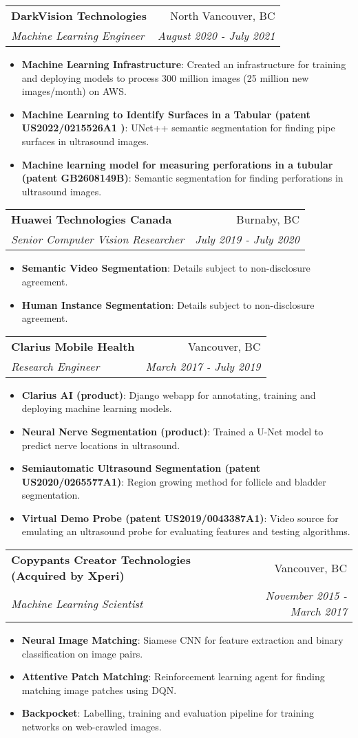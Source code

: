 \documentclass[letterpaper,11pt]{article}
\makeatletter
\newcommand{\resumeItem}[2]{
  \item\small{
    \textbf{#1}{: #2 \vspace{-2pt}}
  }
}
\newcommand{\resumeSubheading}[4]{
  \vspace{-1pt}\item
    \begin{tabular*}{0.97\textwidth}[t]{l@{\extracolsep{\fill}}r}
      \textbf{#1} & #2 \\
      \textit{\small#3} & \textit{\small #4} \\
    \end{tabular*}\vspace{-5pt}
}
\newcommand{\resumeItemListStart}{\begin{itemize}}
\newcommand{\resumeItemListEnd}{\end{itemize}\vspace{-5pt}}
\makeatother
\begin{document}
  \resumeSubheading
    {DarkVision Technologies}{North Vancouver, BC}
    {Machine Learning Engineer}{August 2020 - July 2021}
    \resumeItemListStart
      \resumeItem{Machine Learning Infrastructure}{Created an infrastructure for training and deploying models to process 300 million images (25 million new images/month) on AWS. }
      \resumeItem{Machine Learning to Identify Surfaces in a Tabular (patent US2022/0215526A1
      )}{UNet++ semantic segmentation for finding pipe surfaces in ultrasound images.}
      \resumeItem{Machine learning model for measuring perforations in a tubular (patent GB2608149B)}{Semantic segmentation for finding perforations in ultrasound images.}
    \resumeItemListEnd

  \resumeSubheading
    {Huawei Technologies Canada}{Burnaby, BC}
    {Senior Computer Vision Researcher}{July 2019 - July 2020}
    \resumeItemListStart
      \resumeItem{Semantic Video Segmentation}{Details subject to non-disclosure agreement.}
      \resumeItem{Human Instance Segmentation}{Details subject to non-disclosure agreement.}
    \resumeItemListEnd

    \resumeSubheading
      {Clarius Mobile Health}{Vancouver, BC}
      {Research Engineer}{March 2017 - July 2019}
      \resumeItemListStart
        \resumeItem{Clarius AI (product)}
          {Django webapp for annotating, training and deploying machine learning models.}
        \resumeItem{Neural Nerve Segmentation (product)}
            {Trained a U-Net model to predict nerve locations in ultrasound.}
        \resumeItem{Semiautomatic Ultrasound Segmentation (patent US2020/0265577A1)}
          {Region growing method for follicle and bladder segmentation.}
        \resumeItem{Virtual Demo Probe (patent US2019/0043387A1)}
          {Video source for emulating an ultrasound probe for evaluating features and testing algorithms.}
      \resumeItemListEnd

    \resumeSubheading
      {Copypants Creator Technologies (Acquired by Xperi)}{Vancouver, BC}
      {Machine Learning Scientist}{November 2015 - March 2017}
      \resumeItemListStart
        \resumeItem{Neural Image Matching}
          {Siamese CNN for feature extraction and binary classification on image pairs.}
        \resumeItem{Attentive Patch Matching}
          {Reinforcement learning agent for finding matching image patches using DQN.}
        \resumeItem{Backpocket}
          {Labelling, training and evaluation pipeline for training networks on web-crawled images.}
      \resumeItemListEnd
\end{document}

